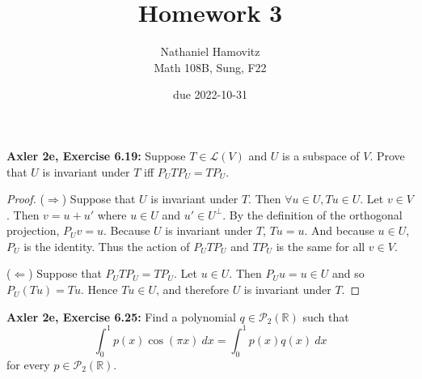 \documentclass{article}
\newcommand{\R}{\mathbb{R}}
\begin{document}
\renewcommand{\labelenumi}{(\alph{enumi})}


\title{Homework 3} %
\author{Nathaniel Hamovitz\\Math 108B, Sung, F22}
\date{due 2022-10-31}

\maketitle


\textbf{Axler 2e, Exercise 6.19: } %
Suppose $T \in \mathcal{L}(V)$ and $U$ is a subspace of $V$. Prove that $U$ is invariant under $T$ iff $P_U T P_U = T P_U$.

\begin{proof}
    ($\Longrightarrow$) Suppose that $U$ is invariant under $T$. Then $\forall u \in U, Tu \in U$. Let $v \in V$. Then $v = u + u'$ where $u \in U$ and $u' \in U^\perp$. By the definition of the orthogonal projection, $P_U v = u$. Because $U$ is invariant under $T$, $T u = u$. And because $u \in U$, $P_U$ is the identity. Thus the action of $P_U T P_U$ and $T P_U$ is the same for all $v \in V$. 

    ($\Longleftarrow$) Suppose that $P_U T P_U  = T P_U$. 
    Let $u \in U$. Then $P_U u = u \in U$ and so $P_U(T u) = Tu$. Hence $Tu \in U$, and therefore $U$ is invariant under $T$.    
\end{proof}


\newpage %


\textbf{Axler 2e, Exercise 6.25: } %
Find a polynomial $q \in \mathcal{P}_2(\R)$ such that
$$\int_0^1 p(x) \cos(\pi x) \: dx = \int_0^1 p(x) q(x) \: dx$$
for every $p \in \mathcal{P}_2(\R)$.
\end{document}
